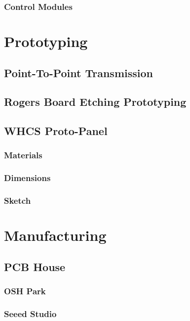   \subsubsection{Control Modules}
\lipsum[1]
\section{Prototyping}
\lipsum[1]
 \subsection{Point-To-Point Transmission}
\lipsum[1]
 \subsection{Rogers Board Etching Prototyping}
\lipsum[1]
 \subsection{WHCS Proto-Panel}
\lipsum[1]
  \subsubsection{Materials}
\lipsum[1]
  \subsubsection{Dimensions}
\lipsum[1]
  \subsubsection{Sketch}
\lipsum[1]
\section{Manufacturing}
\lipsum[1]
 \subsection{PCB House}
\lipsum[1]
  \subsubsection{OSH Park}
\lipsum[1]
  \subsubsection{Seeed Studio}
\lipsum[1]
